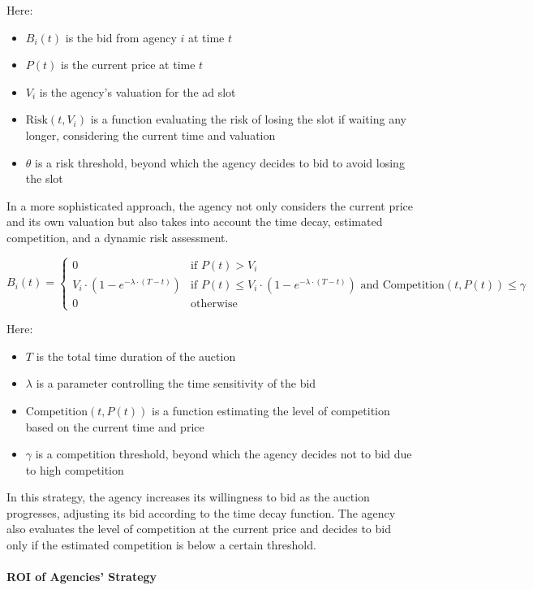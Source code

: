 Here:
\begin{itemize}
    \item \( B_i(t) \) is the bid from agency \( i \) at time \( t \)
    \item \( P(t) \) is the current price at time \( t \)
    \item \( V_i \) is the agency’s valuation for the ad slot
    \item \( \text{Risk}(t, V_i) \) is a function evaluating the risk of losing the slot if waiting any longer, considering the current time and valuation
    \item \( \theta \) is a risk threshold, beyond which the agency decides to bid to avoid losing the slot
\end{itemize}

In a more sophisticated approach, the agency not only considers the current price and its own valuation but also takes into account the time decay, estimated competition, and a dynamic risk assessment.

\[
B_i(t) = 
\begin{cases} 
0 & \text{if } P(t) > V_i \\
V_i \cdot \left(1 - e^{-\lambda \cdot (T-t)}\right) & \text{if } P(t) \leq V_i \cdot \left(1 - e^{-\lambda \cdot (T-t)}\right) \text{ and } \text{Competition}(t, P(t)) \leq \gamma \\
0 & \text{otherwise}
\end{cases}
\]

Here:
\begin{itemize}
    \item \( T \) is the total time duration of the auction
    \item \( \lambda \) is a parameter controlling the time sensitivity of the bid
    \item \( \text{Competition}(t, P(t)) \) is a function estimating the level of competition based on the current time and price
    \item \( \gamma \) is a competition threshold, beyond which the agency decides not to bid due to high competition
\end{itemize}

In this strategy, the agency increases its willingness to bid as the auction progresses, adjusting its bid according to the time decay function. The agency also evaluates the level of competition at the current price and decides to bid only if the estimated competition is below a certain threshold.

\paragraph{ROI of Agencies' Strategy}

